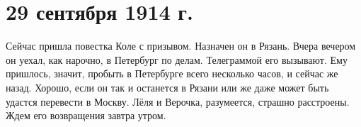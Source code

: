 \section{29 сентября 1914 г.}


Сейчас пришла повестка Коле с призывом. Назначен он в Рязань. Вчера вечером он
уехал, как нарочно, в Петербург по делам. Телеграммой его вызывают. Ему
пришлось, значит, пробыть в Петербурге всего несколько часов, и сейчас же
назад. Хорошо, если он так и останется в Рязани или же даже может быть удастся
перевести в Москву. Лёля и Верочка, разумеется, страшно расстроены. Ждем его
возвращения завтра утром.
